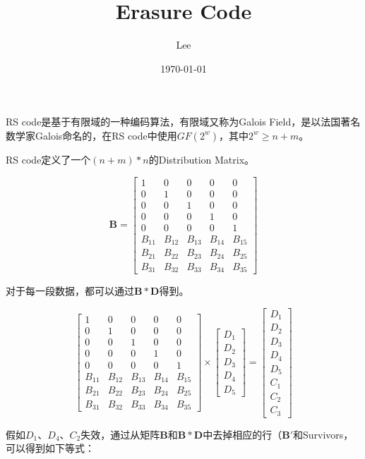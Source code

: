 \documentclass[UTF8,12pt]{ctexart}
\title{Erasure Code}
\author{Lee}
\date{\today}
\begin{document}
RS code是基于有限域的一种编码算法，有限域又称为Galois Field，是以法国著名数学家Galois命名的，在RS code中使用$GF(2^w)$，其中$2^w \ge n + m$。 

RS code定义了一个$(n+m) * n$的Distribution Matrix。

\[
\boldsymbol{B} = \left[
\begin{matrix}
1 & 0 & 0 & 0 & 0\\
0 & 1 & 0 & 0 & 0\\
0 & 0 & 1 & 0 & 0\\
0 & 0 & 0 & 1 & 0\\
0 & 0 & 0 & 0 & 1\\
B_{11} & B_{12} & B_{13} & B_{14} & B_{15}\\
B_{21} & B_{22} & B_{23} & B_{24} & B_{25}\\
B_{31} & B_{32} & B_{33} & B_{34} & B_{35}
\end{matrix}
\right]
\]

对于每一段数据，都可以通过$\boldsymbol{B}*\boldsymbol{D}$得到。

\[
\left[
\begin{matrix}
1 & 0 & 0 & 0 & 0\\
0 & 1 & 0 & 0 & 0\\
0 & 0 & 1 & 0 & 0\\
0 & 0 & 0 & 1 & 0\\
0 & 0 & 0 & 0 & 1\\
B_{11} & B_{12} & B_{13} & B_{14} & B_{15}\\
B_{21} & B_{22} & B_{23} & B_{24} & B_{25}\\
B_{31} & B_{32} & B_{33} & B_{34} & B_{35}
\end{matrix}
\right]
\times
\left[
\begin{matrix}
D_1\\
D_2\\
D_3\\
D_4\\
D_5
\end{matrix}
\right]
=
\left[
\begin{matrix}
D_1\\
D_2\\
D_3\\
D_4\\
D_5\\
C_1\\
C_2\\
C_3
\end{matrix}
\right]
\]

假如$D_1$、$D_4$、$C_2$失效，通过从矩阵$\boldsymbol{B}$和$\boldsymbol{B}*\boldsymbol{D}$中去掉相应的行（$\boldsymbol{B'}$和Survivors，可以得到如下等式：
\end{document}
